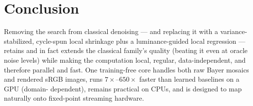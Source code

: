 \documentclass[10pt,twocolumn]{article}
\begin{document}
\section{Conclusion}
Removing the search from classical denoising --- and replacing it with a
variance-stabilized, cycle-spun local shrinkage plus a luminance-guided local
regression --- retains and in fact extends the classical family's quality
(beating it even at oracle noise levels) while making the computation local,
regular, data-independent, and therefore parallel and fast. One training-free
core handles both raw Bayer mosaics and rendered sRGB images, runs
$7\times$--$650\times$ faster than learned baselines on a GPU (domain-%
dependent), remains practical on
CPUs, and is designed to map naturally onto fixed-point streaming hardware.
\end{document}
